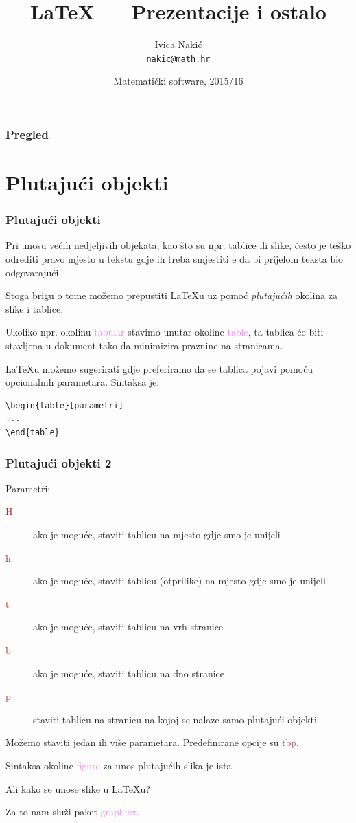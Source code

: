 \documentclass{beamer}
\title{\LaTeX{} --- Prezentacije i ostalo}
\subtitle{}
\author{Ivica Nakić \\ \texttt{nakic@math.hr}}
\institute[PMF--MO]{Matematički odsjek Prirodoslovno--matematičkog fakulteta}
\date[2015/16]{Matematički software, 2015/16}
\theoremstyle{remark}
\theoremstyle{definition}
\begin{document}
\begin{frame}
  \maketitle  
\end{frame}

\begin{frame}
\frametitle{Pregled}
  \tableofcontents  
\end{frame}

\section{Plutajući objekti}

\begin{frame}[fragile]
\frametitle{Plutajući objekti}
Pri unosu većih nedjeljivih objekata, kao što su npr. tablice ili slike, često je teško odrediti pravo mjesto u tekstu gdje ih treba smjestiti e da bi prijelom teksta bio odgovarajući.

Stoga brigu o tome možemo prepustiti \LaTeX{}u uz pomoć \emph{plutajućih} okolina za slike i tablice. 

Ukoliko npr. okolinu \textcolor{violet}{tabular} stavimo unutar okoline \textcolor{violet}{table}, ta tablica će biti stavljena u dokument tako da minimizira praznine na stranicama.

\LaTeX{}u možemo sugerirati gdje preferiramo da se tablica pojavi pomoću opcionalnih parametara. Sintaksa je:
\begin{lstlisting}
\begin{table}[parametri]
...
\end{table}
\end{lstlisting}
\end{frame}

\begin{frame}
\frametitle{Plutajući objekti 2}
Parametri:
\begin{description}
\item[\textcolor{brown}{H}] ako je moguće, staviti tablicu na mjesto gdje smo je unijeli
\item[\textcolor{brown}{h}] ako je moguće, staviti tablicu (otprilike) na mjesto gdje smo je unijeli
\item[\textcolor{brown}{t}] ako je moguće, staviti tablicu na vrh stranice
\item[\textcolor{brown}{b}] ako je moguće, staviti tablicu na dno stranice
\item[\textcolor{brown}{p}] staviti tablicu na stranicu na kojoj se nalaze samo plutajući objekti.
\end{description}
Možemo staviti jedan ili više parametara. Predefinirane opcije su \textcolor{brown}{tbp}.

Sintaksa okoline \textcolor{violet}{figure} za unos plutajućih slika je ista. 

Ali kako se unose slike u \LaTeX u?

Za to nam služi paket \textcolor{violet}{graphicx}. 
\end{frame}
\end{document}
